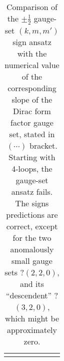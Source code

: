 \begin{table}
{\begin{tabular}{r@{~~~~}ccccc@{~~~~}l}
$$%
\bottomrule
\end{tabular}
} %
\caption{\label{tabGaugeSets}
Comparison of the $\pm\frac{1}{2}$ gauge-set $(k,m,m')$ sign ansatz
 with the numerical value of the corresponding slope of
the {Dirac} form factor gauge set, stated in $(\cdots)$ bracket.
Starting with 4-loops, the gauge-set ansatz  fails.
The signs predictions are correct, except for the two anomalously small gauge sets
?$(2,2,0)$, and its ``descendent'' ?$(3,2,0)$, which might be approximately zero.
}
\end{table}
